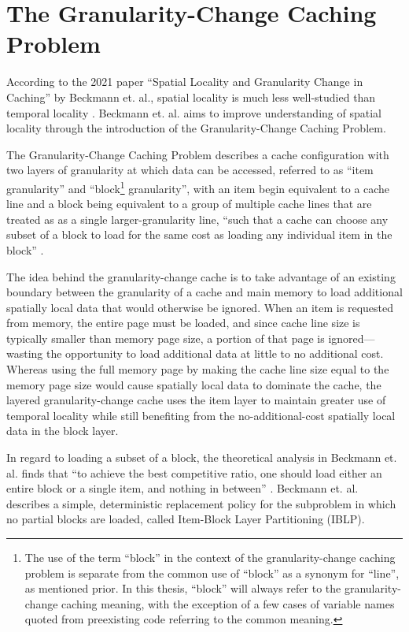 \documentclass[12pt,twoside]{reedthesis}
\begin{document}
\section{The Granularity-Change Caching Problem}

According to the 2021 paper ``Spatial Locality and Granularity Change in Caching'' by Beckmann et. al., spatial locality is much less well-studied than temporal locality  \cite{beckmann}. Beckmann et. al. aims to improve understanding of spatial locality through the introduction of the Granularity-Change Caching Problem.

The Granularity-Change Caching Problem describes a cache configuration with two layers of granularity at which data can be accessed, referred to as ``item granularity'' and ``block\footnote{The use of the term ``block'' in the context of the granularity-change caching problem is separate from the common use of ``block'' as a synonym for ``line'', as mentioned prior. In this thesis, ``block'' will always refer to the granularity-change caching meaning, with the exception of a few cases of variable names quoted from preexisting code referring to the common meaning.} granularity'', with an item begin equivalent to a cache line and a block being equivalent to a group of multiple cache lines that are treated as as a single larger-granularity line, ``such that a cache can choose any subset of a block to load for the same cost as loading any individual item in the block'' \cite{beckmann}.

The idea behind the granularity-change cache is to take advantage of an existing boundary between the granularity of a cache and main memory to load additional spatially local data that would otherwise be ignored. When an item is requested from memory, the entire page must be loaded, and since cache line size is typically smaller than memory page size, a portion of that page is ignored---wasting the opportunity to load additional data at little to no additional cost. Whereas using the full memory page by making the cache line size equal to the memory page size would cause spatially local data to dominate the cache, the layered granularity-change cache uses the item layer to maintain greater use of temporal locality while still benefiting from the no-additional-cost spatially local data in the block layer.

In regard to loading a subset of a block, the theoretical analysis in Beckmann et. al. finds that ``to achieve the best competitive ratio, one should load either an entire block or a single item, and nothing in between'' \cite{beckmann}. Beckmann et. al. describes a simple, deterministic replacement policy for the subproblem in which no partial blocks are loaded, called Item-Block Layer Partitioning (IBLP).
\end{document}
